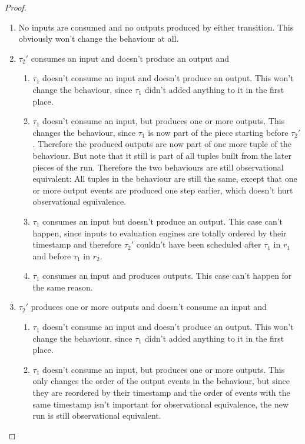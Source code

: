 \begin{proof}
  \begin{enumerate}
    \item No inputs are consumed and no outputs produced by either transition. This obviously won't change the behaviour at all.
    \item \(\tau_2'\) consumes an input and doesn't produce an output and
      \begin{enumerate}
        \item \(\tau_1\) doesn't consume an input and doesn't produce an output. This won't change the behaviour, since \(\tau_1\) didn't added anything to it in the first place.
        \item\label{sec:behaviours:without_timing:greedy:non_greedy_1} \(\tau_1\) doesn't consume an input, but produces one or more outputs. This changes the behaviour, since \(\tau_1\) is now part of the piece starting before \(\tau_2'\). Therefore the produced outputs are now part of one more tuple of the behaviour. But note that it still is part of all tuples built from the later pieces of the run. Therefore the two behaviours are still observational equivalent: All tuples in the behaviour are still the same, except that one or more output events are produced one step earlier, which doesn't hurt observational equivalence.
        \item\label{sec:behaviours:without_timing:greedy:impossible_case} \(\tau_1\) consumes an input but doesn't produce an output. This case can't happen, since inputs to evaluation engines are totally ordered by their timestamp and therefore \(\tau_2'\) couldn't have been scheduled after \(\tau_1\) in \(r_1\) and before \(\tau_1\) in \(r_2\).
        \item \(\tau_1\) consumes an input and produces outputs. This case can't happen for the same reason.
      \end{enumerate}
    \item \(\tau_2'\) produces one or more outputs and doesn't consume an input and
      \begin{enumerate}
        \item \(\tau_1\) doesn't consume an input and doesn't produce an output. This won't change the behaviour, since \(\tau_1\) didn't added anything to it in the first place.
        \item \(\tau_1\) doesn't consume an input, but produces one or more outputs. This only changes the order of the output events in the behaviour, but since they are reordered by their timestamp and the order of events with the same timestamp isn't important for observational equivalence, the new run is still observational equivalent.

\end{enumerate}
\end{enumerate}
\end{proof}

